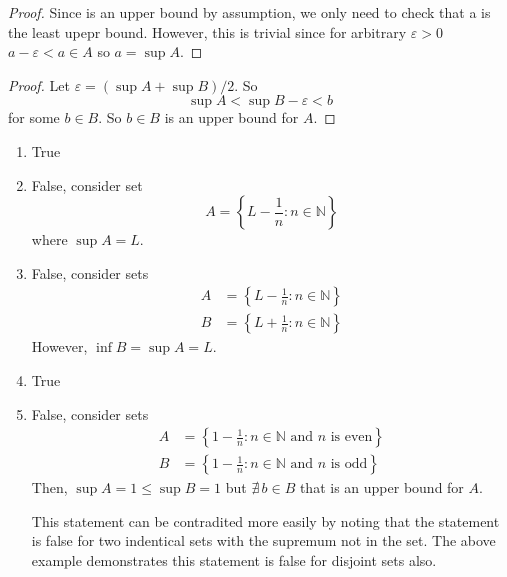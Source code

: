 \begin{proof}
    Since is an upper bound by assumption, we only need to check that
    a is the least upepr bound. However, this is trivial since for arbitrary $\varepsilon > 0$ $a - \varepsilon < a \in A$ so $a = \sup A$.
\end{proof}

\begin{proof}
    Let $\varepsilon = (\sup A + \sup B) / 2$. So
    \begin{equation*}
        \sup A < \sup B - \varepsilon < b
    \end{equation*}
    for some $b \in B$. So $b \in  B$ is an upper bound for $A$. 
\end{proof}

\begin{enumerate}[label=(\alph*)]
    \item True
    
    \item 
    False, consider set 
    \begin{equation*}
        A = \left\{ L - \frac{1}{n} : n \in \mathbb{N} \right\}
    \end{equation*}
    where $\sup A = L$.
    
    \item 
    False, consider sets
    \begin{align*}
        A &= \left\{ L - \frac{1}{n} : n \in \mathbb{N} \right\} \\
        B &= \left\{ L + \frac{1}{n} : n \in \mathbb{N} \right\}
    \end{align*}
    However, $\inf B = \sup A = L$.

    \item True

    \item 
    False, consider sets
    \begin{align*}
        A &= \left\{ 1 - \frac{1}{n} : n \in \mathbb{N} \text{ and } n \text{ is even} \right\} \\
        B &= \left\{ 1 - \frac{1}{n} : n \in \mathbb{N} \text{ and } n \text{ is odd} \right\}
    \end{align*}
    Then, $\sup A = 1 \leq \sup B = 1$ but $\nexists \, b \in B$ that is an upper bound for $A$.

    This statement can be contradited more easily by noting that the 
    statement is false for two indentical sets with the supremum not in 
    the set. The above example demonstrates this statement is
    false for disjoint sets also.
\end{enumerate}
    
